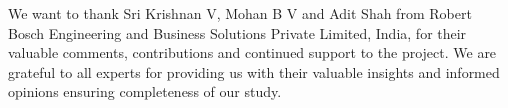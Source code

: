 \documentclass{article}
\begin{document}
\begin{ack}
We want to thank Sri Krishnan V, Mohan B V and Adit Shah from Robert Bosch Engineering and Business Solutions Private Limited, India, for their valuable comments, contributions and continued support to the project. We are grateful to all experts for providing us with their valuable insights and informed opinions ensuring completeness of our study.
\end{ack}



\end{document}
